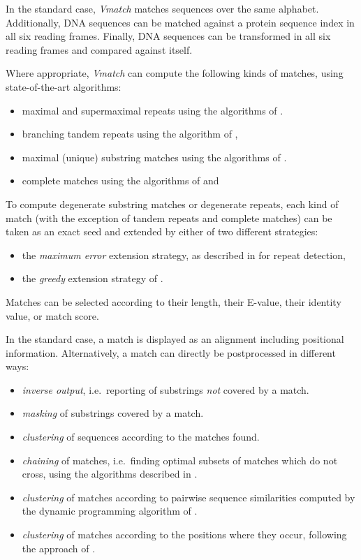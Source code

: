 \documentclass[12pt,titlepage]{article}
\begin{document}
\begin{AboutVmatch}
In the standard case, \emph{Vmatch} matches sequences over the same alphabet.
Additionally, DNA sequences can be matched against a protein sequence
index in all six reading frames. Finally, DNA sequences can be 
transformed in all six reading frames and compared against itself.

Where appropriate, \emph{Vmatch} can compute the
following kinds of matches, using state-of-the-art algorithms:

\begin{itemize}
\item
maximal and supermaximal repeats
using the algorithms of \cite{ABO:KUR:OHL:2004}.
\item
branching tandem repeats
using the algorithm of \cite{ABO:KUR:OHL:2002},
\item
maximal (unique) substring matches
using the algorithms of \cite{KUR:2002B}.
\item
complete matches
using the algorithms of \cite{MAN:MYE:1993} and \cite{MYE:1999}
\end{itemize}
To compute degenerate substring matches or degenerate repeats,
each kind of match (with the exception of tandem repeats and complete matches)
can be taken as an exact seed and extended by either
of two different strategies:
\begin{itemize}
\item
the \emph{maximum error} extension strategy, as described in 
\cite{KUR:CHO:OHL:SCHLE:STO:GIE:2001} for repeat detection,
\item
the \emph{greedy} extension strategy of \cite{ZHA:SCHWA:WAG:MIL:2000}.
\end{itemize}
Matches can be selected according to their length, their
E-value, their identity value, or match score.

In the standard case, a match is displayed as an alignment
including positional information.
Alternatively, a match can directly be postprocessed in
different ways:

\begin{itemize}
\item
\emph{inverse output}, i.e.\ reporting of substrings 
\emph{not} covered by a match.
\item
\emph{masking} of substrings covered by a match.
\item
\emph{clustering} of sequences according to the matches found.
\item
\emph{chaining} of matches, i.e.\ finding optimal subsets
of matches which do not cross, using the algorithms described in
\cite{ABO:OHL:2003}.
\item
\emph{clustering} of  matches according to pairwise sequence similarities
computed by the dynamic programming algorithm of \cite{UKK:1985A}.
\item
\emph{clustering} of matches according to the positions
where they occur, following the approach of 
\cite{VOL:HAA:SAL:2001}.
\end{itemize}


\end{AboutVmatch}
\end{document}
